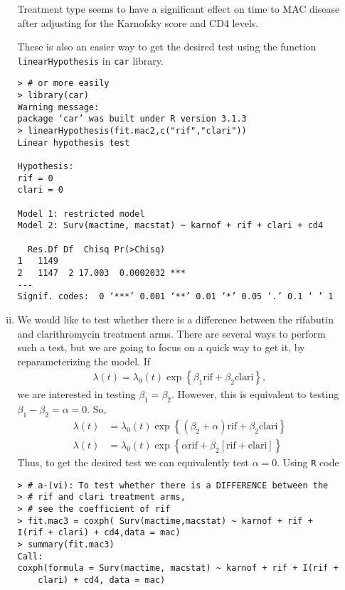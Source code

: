 \begin{enumerate}[(a)]
\begin{enumerate}[(i)]
Treatment type seems to have a significant effect on time to MAC disease after adjusting for the Karnofsky score and CD4 levels. 

These is also an easier way to get the desired test using the function \verb|linearHypothesis| in \verb|car| library.
\begin{spacing}{1.2}
\begin{footnotesize}
\begin{verbatim}
> # or more easily
> library(car)
Warning message:
package ‘car’ was built under R version 3.1.3 
> linearHypothesis(fit.mac2,c("rif","clari"))
Linear hypothesis test

Hypothesis:
rif = 0
clari = 0

Model 1: restricted model
Model 2: Surv(mactime, macstat) ~ karnof + rif + clari + cd4

  Res.Df Df  Chisq Pr(>Chisq)    
1   1149                         
2   1147  2 17.003  0.0002032 ***
---
Signif. codes:  0 ‘***’ 0.001 ‘**’ 0.01 ‘*’ 0.05 ‘.’ 0.1 ‘ ’ 1
\end{verbatim}
\end{footnotesize}
\end{spacing} 
\item We would like to test whether there is a difference between the rifabutin and clarithromycin treatment arms. There are several ways to perform such a test, but we are going to focus on a quick way to get it, by reparameterizing
the model. If
\begin{align}
\lambda(t) = \lambda_{0}(t)\exp\left\{\beta_{1}\text{rif}+\beta_{2}\text{clari}\right\},\nonumber 
\end{align}      
we are interested in testing $\beta_{1}=\beta_{2}$. However, this is equivalent to testing $\beta_{1}-\beta_{2} = \alpha = 0$. So,
\begin{align}
\lambda(t) &= \lambda_{0}(t)\exp\left\{(\beta_{2}+\alpha)\text{rif}+\beta_{2}\text{clari}\right\} \nonumber \\
\lambda(t) &= \lambda_{0}(t)\exp\left\{\alpha \text{rif}+\beta_{2}[\text{rif}+\text{clari}]\right\} \nonumber
\end{align}
Thus, to get the desired test we can equivalently test $\alpha=0$. Using \verb|R| code
\begin{footnotesize}
\begin{verbatim}
> # a-(vi): To test whether there is a DIFFERENCE between the 
> # rif and clari treatment arms, 
> # see the coefficient of rif 
> fit.mac3 = coxph( Surv(mactime,macstat) ~ karnof + rif + I(rif + clari) + cd4,data = mac)
> summary(fit.mac3)
Call:
coxph(formula = Surv(mactime, macstat) ~ karnof + rif + I(rif + 
    clari) + cd4, data = mac)


\end{verbatim}
\end{footnotesize}
\end{enumerate}
\end{enumerate}
